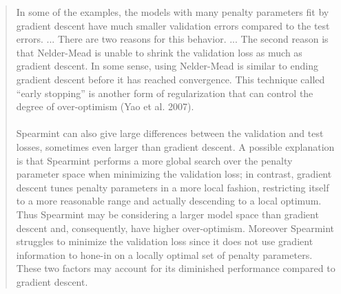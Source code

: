 \documentclass[]{article}
\begin{document}
\begin{enumerate}
		\begin{quote}
			In some of the examples, the models with many penalty parameters fit by gradient descent have much smaller validation errors compared to the test errors. ... There are two reasons for this behavior. ... The second reason is that Nelder-Mead is unable to shrink the validation loss as much as gradient descent. In some sense, using Nelder-Mead is similar to ending gradient descent before it has reached convergence. This technique called ``early stopping'' is another form of regularization that can control the degree of over-optimism (Yao et al. 2007).
			\\
			\\
			Spearmint can also give large differences between the validation and test losses, sometimes even larger than gradient descent.
			A possible explanation is that Spearmint performs a more global search over the penalty parameter space when minimizing the validation loss; in contrast, gradient descent tunes penalty parameters in a more local fashion, restricting itself to a more reasonable range and actually descending to a local optimum.
			Thus Spearmint may be considering a larger model space than gradient descent and, consequently, have higher over-optimism.
			Moreover Spearmint struggles to minimize the validation loss since it does not use gradient information to hone-in on a locally optimal set of penalty parameters.
			These two factors may account for its diminished performance compared to gradient descent.
		\end{quote}
		
	\end{enumerate}
\end{document}
